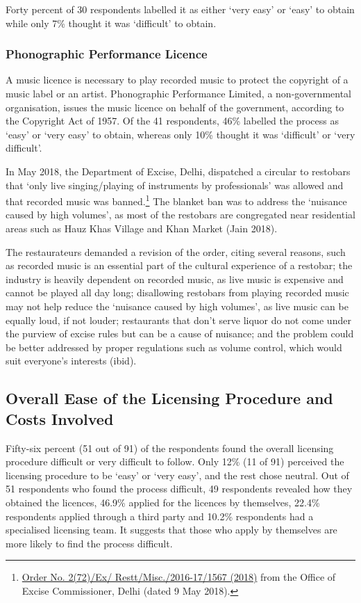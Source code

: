 \documentclass[a4paper, 12pt]{article}
\begin{document}
		Forty percent of 30 respondents labelled it as either ‘very easy’ or ‘easy’ to obtain while only 7\% thought it was ‘difficult’ to obtain. %
		
		
		\subsubsection{Phonographic Performance Licence}
		A music licence is necessary to play recorded music to protect the copyright of a music label or an artist. Phonographic Performance Limited, a non-governmental organisation, issues the music licence on behalf of the government, according to the 
Copyright Act of 1957. Of the 41 respondents, 46\% labelled the process as ‘easy’ or ‘very easy’ to obtain, whereas only 10\% thought it was ‘difficult’ or ‘very difficult’.
		
		In May 2018, the Department of Excise, Delhi, dispatched a circular to restobars that ‘only live singing/playing of instruments by professionals’ was allowed and that recorded music was banned.\footnote{\href{https://bit.ly/2MzCM02} {Order No. 2(72)/Ex/
Restt/Misc./2016-17/1567 (2018)} from the Office of Excise Commissioner, Delhi (dated 9 May 2018).} The blanket ban was to address the ‘nuisance caused by high volumes’, as most of the restobars are congregated near residential areas such as Hauz Khas 
Village and Khan Market (Jain 2018).
		
		The restaurateurs demanded a revision of the order, citing several reasons, such as recorded music is an essential part of the cultural experience of a restobar; the industry is heavily dependent on recorded music, as live music is expensive and cannot 
be played all day long; disallowing restobars from playing recorded music may not help reduce the ‘nuisance caused by high volumes’, as live music can be equally loud, if not louder; restaurants that don’t serve liquor do not come under the purview of excise rules 
but can be a cause of nuisance; and the problem could be better addressed by proper regulations such as volume control, which would suit everyone’s interests (ibid).
		
		
		
		\subsection{Overall Ease of the Licensing Procedure and Costs Involved}
		Fifty-six percent (51 out of 91) of the respondents found the overall licensing procedure difficult or very difficult to follow. Only 12\% (11 of 91) perceived the licensing procedure to be ‘easy’ or ‘very easy’, and the rest chose neutral. Out of 51 respondents 
who found the process difficult, 49 respondents revealed how they obtained the licences, 46.9\% applied for the licences by themselves, 22.4\% respondents applied through a third party and 10.2\% respondents had a specialised licensing team. It suggests that 
those who apply by themselves are more likely to find the process difficult.
		
\end{document}
